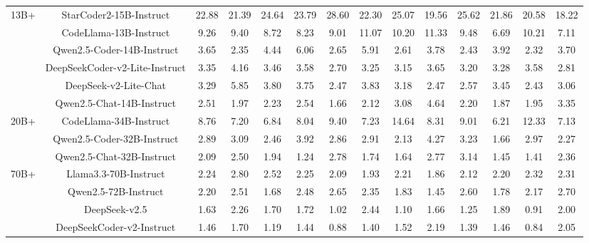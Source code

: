 \documentclass[11pt, a4paper, logo, copyright, nonumbering, amsart]{map}
\begin{document}
\begin{CJK*}{UTF8}{gbsn}
\begin{table*}[h!]
\begin{adjustbox}{width=\textwidth}
\begin{tabular}{c|c|cccccccccccc}
    \midrule
    \multirow{6}{*}{13B+} 
    & StarCoder2-15B-Instruct & 22.88 & 21.39 & 24.64 & 23.79 & 28.60 & 22.30 & 25.07 & 19.56 & 25.62 & 21.86 & 20.58 & 18.22 \\
    & CodeLlama-13B-Instruct & 9.26 & 9.40 & 8.72 & 8.23 & 9.01 & 11.07 & 10.20 & 11.33 & 9.48 & 6.69 & 10.21 & 7.11 \\
    & Qwen2.5-Coder-14B-Instruct & 3.65 & 2.35 & 4.44 & 6.06 & 2.65 & 5.91 & 2.61 & 3.78 & 2.43 & 3.92 & 2.32 & 3.70 \\
    & DeepSeekCoder-v2-Lite-Instruct & 3.35 & 4.16 & 3.46 & 3.58 & 2.70 & 3.25 & 3.15 & 3.65 & 3.20 & 3.28 & 3.58 & 2.81 \\
    & DeepSeek-v2-Lite-Chat & 3.29 & 5.85 & 3.80 & 3.75 & 2.47 & 3.83 & 3.18 & 2.47 & 2.57 & 3.45 & 2.43 & 3.06 \\
    & Qwen2.5-Chat-14B-Instruct & 2.51 & 1.97 & 2.23 & 2.54 & 1.66 & 2.12 & 3.08 & 4.64 & 2.20 & 1.87 & 1.95 & 3.35 \\
    
    \midrule
    \multirow{3}{*}{20B+}
    & CodeLlama-34B-Instruct & 8.76 & 7.20 & 6.84 & 8.04 & 9.40 & 7.23 & 14.64 & 8.31 & 9.01 & 6.21 & 12.33 & 7.13 \\
    & Qwen2.5-Coder-32B-Instruct & 2.89 & 3.09 & 2.46 & 3.92 & 2.86 & 2.91 & 2.13 & 4.27 & 3.23 & 1.66 & 2.97 & 2.27 \\
    & Qwen2.5-Chat-32B-Instruct & 2.09 & 2.50 & 1.94 & 1.24 & 2.78 & 1.74 & 1.64 & 2.77 & 3.14 & 1.45 & 1.41 & 2.36 \\
    
    \midrule
    \multirow{4}{*}{70B+} 
    & Llama3.3-70B-Instruct & 2.24 & 2.80 & 2.52 & 2.25 & 2.09 & 1.93 & 2.21 & 1.86 & 2.12 & 2.20 & 2.32 & 2.31 \\
    & Qwen2.5-72B-Instruct & 2.20 & 2.51 & 1.68 & 2.48 & 2.65 & 2.35 & 1.83 & 1.45 & 2.60 & 1.78 & 2.17 & 2.70 \\
    & DeepSeek-v2.5 & 1.63 & 2.26 & 1.70 & 1.72 & 1.02 & 2.44 & 1.10 & 1.66 & 1.25 & 1.89 & 0.91 & 2.00 \\
    & DeepSeekCoder-v2-Instruct & 1.46 & 1.70 & 1.19 & 1.44 & 0.88 & 1.40 & 1.52 & 2.19 & 1.39 & 1.46 & 0.84 & 2.05 \\
    

\end{tabular}
\end{adjustbox}
\end{table*}
\end{CJK*}
\end{document}

